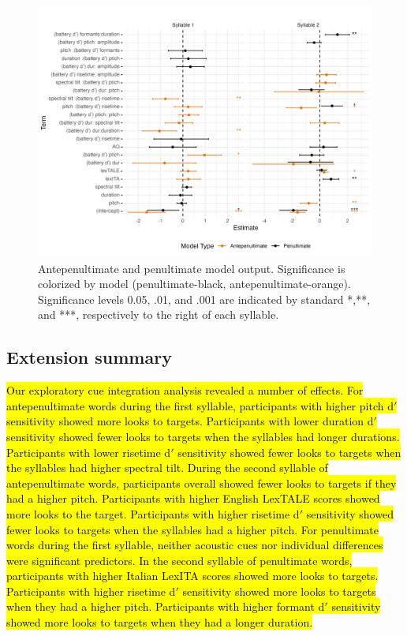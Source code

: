 \begin{figure}[H]
  \centering
  \includegraphics[width=1\linewidth]{visuals/extended_analysis.jpeg} %
  \caption{Antepenultimate and penultimate model output. Significance is colorized by model (penultimate-black, antepenultimate-orange). Significance levels 0.05, .01, and .001 are indicated by standard *,**, and ***, respectively to the right of each syllable.}
  \label{fig:extened_analysis}
\end{figure}


\subsection{Extension summary}

\hl{Our exploratory cue integration analysis revealed a number of effects. For antepenultimate words during the first syllable, participants with higher pitch d$'$ sensitivity showed more looks to targets. Participants with lower duration d$'$ sensitivity showed fewer looks to targets when the syllables had longer durations. Participants with lower risetime d$'$ sensitivity showed fewer looks to targets when the syllables had higher spectral tilt. During the second syllable of antepenultimate words, participants overall showed fewer looks to targets if they had a higher pitch. Participants with higher English LexTALE scores showed more looks to the target. Participants with higher risetime d$'$ sensitivity showed fewer looks to targets when the syllables had a higher pitch. For penultimate words during the first syllable, neither acoustic cues nor individual differences were significant predictors. In the second syllable of penultimate words, participants with higher Italian LexITA scores showed more looks to targets. Participants with higher risetime d$'$ sensitivity showed more looks to targets when they had a higher pitch. Participants with higher formant d$'$ sensitivity showed more looks to targets when they had a longer duration.
}
